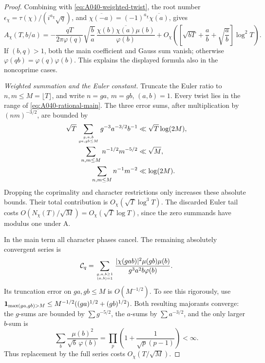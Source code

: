 \begin{proof}
Combining with \eqref{eq:A040-weighted-twist}, the root number
$\epsilon_\chi=\tau(\chi)/(i^{a_\chi}\sqrt q)$, and
$\overline{\chi(-a)}=(-1)^{a_\chi}\overline{\chi(a)}$, gives
\begin{equation}\label{eq:A040-rational-main}
 A_\chi(T,b/a)=
 -\frac{qT}{2\pi\varphi(q)}\sqrt{\frac ba}\,
        \frac{\chi(b)\overline{\chi(a)}\mu(b)}{\varphi(b)}
 +O_\chi\left(
       \left[\sqrt{bT}+\frac ab+\sqrt{\frac ab}\right]\log^2T\right).
\end{equation}
If $(b,q)>1$, both the main coefficient and Gauss sum vanish;
otherwise $\varphi(qb)=\varphi(q)\varphi(b)$. This explains
the displayed formula also in the noncoprime cases.

\emph{Weighted summation and the Euler constant.}
Truncate the Euler ratio to $n,m\le M=\lfloor T\rfloor$,
and write $n=ga$, $m=gb$, $(a,b)=1$. Every twist lies in the
range of \eqref{eq:A040-rational-main}. The three error sums,
after multiplication by $(nm)^{-3/2}$, are bounded by
\begin{align*}
 \sqrt T\sum_{g,a,b\atop ga,gb\le M}g^{-3}a^{-3/2}b^{-1}
       &\ll\sqrt T\log(2M),\\
 \sum_{n,m\le M}n^{-1/2}m^{-5/2}&\ll\sqrt M,\\
 \sum_{n,m\le M}n^{-1}m^{-2}&\ll\log(2M).
\end{align*}
Dropping the coprimality and character restrictions only
increases these absolute bounds. Their total contribution is
$O_\chi(\sqrt T\log^3T)$.
The discarded Euler tail costs
$O(N_\chi(T)/\sqrt M)=O_\chi(\sqrt T\log T)$, since the
zero summands have modulus one under A.

In the main term all character phases cancel. The remaining
absolutely convergent series is
\begin{equation}\label{eq:A040-constant-series}
 \mathcal C_q=\sum_{g,a,b\ge1\atop(a,b)=1}
 \frac{|\chi(gab)|^2\mu(gb)\mu(b)}
                         {g^3a^2b\varphi(b)}.
\end{equation}
Its truncation error on $ga,gb\le M$ is $O(M^{-1/2})$.
To see this rigorously, use
${\bf1}_{\max(ga,gb)>M}\le
M^{-1/2}((ga)^{1/2}+(gb)^{1/2})$.
Both resulting majorants converge: the $g$-sums are bounded by
$\sum g^{-5/2}$, the $a$-sums by $\sum a^{-3/2}$, and the
only larger $b$-sum is
\[
 \sum_b\frac{\mu(b)^2}{\sqrt b\,\varphi(b)}
       =\prod_p\left(1+\frac1{\sqrt p(p-1)}\right)<\infty.
\]
Thus replacement by the full series costs $O_\chi(T/\sqrt M)$.


\end{proof}
